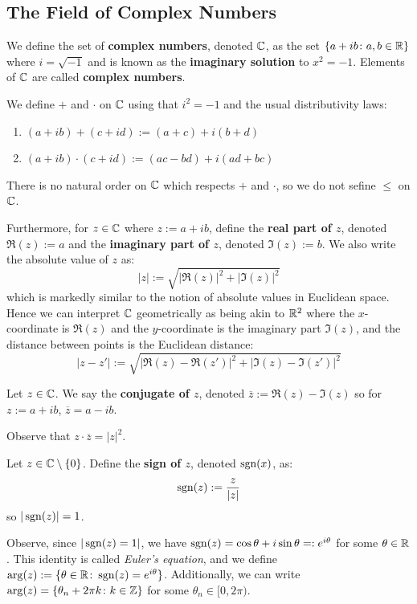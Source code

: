 \subsection{The Field of Complex Numbers}

   \begin{defbox}
      We define the set of \textbf{complex numbers}, denoted $\mathbb{C}$, as the set $\{a + ib \colon a, b \in \mathbb{R}\}$ where $i = \sqrt{-1}$ and is known as the \textbf{imaginary solution} to $x^2 = -1$.  Elements of $\mathbb{C}$ are called \textbf{complex numbers}.
   \end{defbox}

   We define $+$ and $\cdot$ on $\mathbb{C}$ using that $i^2 = -1$ and the usual distributivity laws:
   \begin{enumerate}
      \item $(a + ib) + (c + id) := (a + c) + i(b + d)$
      \item $(a + ib) \cdot (c + id) := (ac - bd) + i(ad + bc)$
   \end{enumerate}
   There is no natural order on $\mathbb{C}$ which respects $+$ and $\cdot$, so we do not sefine $\leq$ on $\mathbb{C}$.

   Furthermore, for $z \in \mathbb{C}$ where $z := a + ib$, define the \textbf{real part of $z$}, denoted $\Re(z) := a$ and the \textbf{imaginary part of $z$}, denoted $\Im(z) := b$. We also write the absolute value of $z$ as:
   \[ |z| := \sqrt{|\Re(z)|^2 + |\Im(z)|^2} \]
   which is markedly similar to the notion of absolute values in Euclidean space. Hence we can interpret $\mathbb{C}$ geometrically as being akin to $\mathbb{R}^2$ where the $x$-coordinate is $\Re(z)$ and the $y$-coordinate is the 
imaginary part $\Im(z)$, and the distance between points is the Euclidean distance:
   \[ |z - z'| := \sqrt{|\Re(z)-\Re(z')|^2 + |\Im(z)-\Im(z')|^2} \]

\begin{defbox}
   Let $z \in \mathbb{C}$. We say the \textbf{conjugate of $z$}, denoted $\overline{z} := \Re(z) - \Im(z)$ so for $z := a + ib$, $\overline{z} = a - ib$.
\end{defbox}
Observe that $z \cdot \overline{z} = |z|^2$.
\begin{defbox}
   Let $z \in \mathbb{C} \setminus \{0\}$. Define the \textbf{sign of $z$}, denoted $\operatorname{sgn}(x)$, as:
   \[ \operatorname{sgn}(z) := \frac{z}{|z|} \]
   so $|\operatorname{sgn}(z)| = 1$. 
\end{defbox}
Observe, since $|\operatorname{sgn}(z) = 1|$, we have $\operatorname{sgn}(z) = \cos\theta + i\sin\theta =: e^{i\theta}$ for some $\theta \in \mathbb{R}$. This identity is called \textit{Euler's equation}, and we define $\arg(z) := \{\theta \in \mathbb{R} \colon \operatorname{sgn}(z) = e^{i\theta}\}$. Additionally, we can write $\arg(z) = \{\theta_n + 2\pi k \colon k \in \mathbb{Z}\}$ for some $\theta_n \in [0, 2\pi)$.

